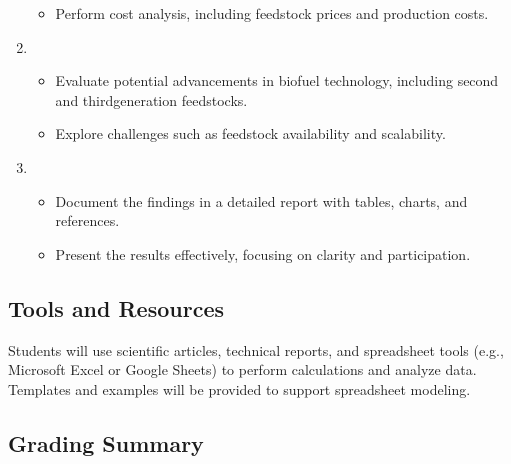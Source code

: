 \documentclass[letterpaper,10pt,english]{jupyterBook}
\begin{document}
\begin{enumerate}
\begin{itemize}
\item {} 
\sphinxAtStartPar
Perform cost analysis, including feedstock prices and production costs.

\end{itemize}

\item {} 
\sphinxAtStartPar
{}
\begin{itemize}
\item {} 
\sphinxAtStartPar
Evaluate potential advancements in biofuel technology, including second\sphinxhyphen{} and third\sphinxhyphen{}generation feedstocks.

\item {} 
\sphinxAtStartPar
Explore challenges such as feedstock availability and scalability.

\end{itemize}

\item {} 
\sphinxAtStartPar
{}
\begin{itemize}
\item {} 
\sphinxAtStartPar
Document the findings in a detailed report with tables, charts, and references.

\item {} 
\sphinxAtStartPar
Present the results effectively, focusing on clarity and participation.

\end{itemize}

\end{enumerate}


\subsection{Tools and Resources}
\label{\detokenize{ProjectInstructions:id43}}
\sphinxAtStartPar
Students will use scientific articles, technical reports, and spreadsheet tools (e.g., Microsoft Excel or Google Sheets) to perform calculations and analyze data. Templates and examples will be provided to support spreadsheet modeling.


\subsection{Grading Summary}
\label{\detokenize{ProjectInstructions:id44}}
\end{document}
